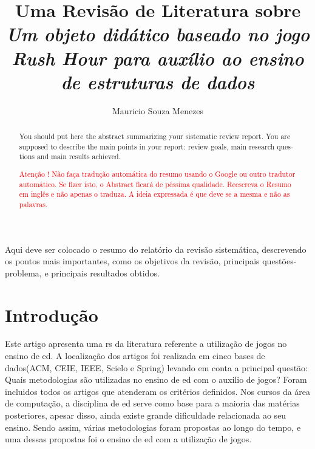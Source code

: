 \documentclass[12pt]{article}
\title{Uma Revisão de Literatura sobre \textit{Um objeto didático baseado no jogo Rush Hour para auxílio ao ensino de estruturas de dados}}
\author{Mauricio Souza Menezes\\}
\begin{document}

\maketitle

\begin{resumo}
    Aqui deve ser colocado o resumo do relatório da revisão sistemática, descrevendo os pontos mais importantes, como os objetivos da revisão, principais questões-problema, e principais resultados obtidos.
\end{resumo}


\begin{abstract}
    \begin{otherlanguage}{english}
        You should put here the abstract summarizing your sistematic review report. You are supposed to describe the main points in your report: review goals, main research questions and main results achieved.
    \end{otherlanguage} \textcolor{red}{Atenção ! Não faça tradução automática do resumo usando o Google ou outro tradutor automático. Se fizer isto, o Abstract ficará de péssima qualidade. Reescreva o Resumo em inglês e não apenas o traduza. A ideia expressada é que deve se a mesma e não as palavras.}
\end{abstract}


\section{Introdução}

Este artigo apresenta uma \gls{rs} da literatura referente a utilização de jogos no ensino de \gls{ed}. A localização dos artigos foi realizada em cinco bases de dados(ACM, CEIE, IEEE, Scielo e Spring) levando em conta a principal questão: Quais metodologias são utilizadas no ensino de \gls{ed} com o auxilio de jogos? Foram incluidos todos os artigos que atenderam os critérios definidos.
Nos cursos da área de computação, a disciplina de \gls{ed} serve como base para a maioria das matérias posteriores, apesar disso, ainda existe grande dificuldade relacionada ao seu ensino. Sendo assim, várias metodologias foram propostas ao longo do tempo, e uma dessas propostas foi o ensino de \gls{ed} com a utilização de jogos.
\end{document}
